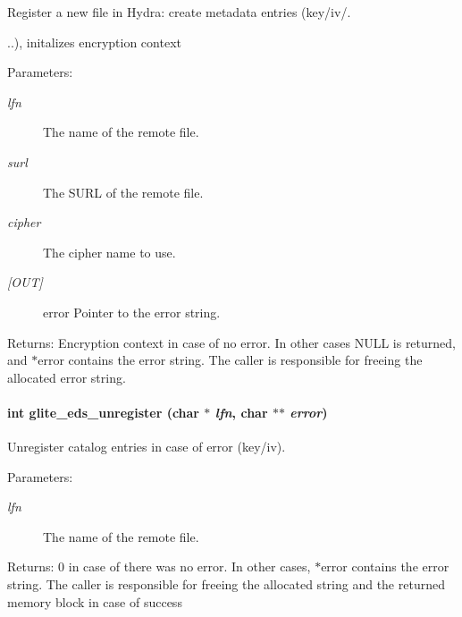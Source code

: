 Register a new file in Hydra: create metadata entries (key/iv/. 

..), initalizes encryption context

\begin{Desc}
\item[Parameters:]
\begin{description}
\item[{\em lfn}]The name of the remote file. \item[{\em surl}]The SURL of the remote file. \item[{\em cipher}]The cipher name to use. \item[{\em \mbox{[}OUT\mbox{]}}]error Pointer to the error string.\end{description}
\end{Desc}
\begin{Desc}
\item[Returns:]Encryption context in case of no error. In other cases NULL is returned, and $\ast$error contains the error string. The caller is responsible for freeing the allocated error string. \end{Desc}
\hypertarget{eds-simple_8h_a9}{
\paragraph[glite\_\-eds\_\-unregister]{\setlength{\rightskip}{0pt plus 5cm}int glite\_\-eds\_\-unregister (char $\ast$ {\em lfn}, char $\ast$$\ast$ {\em error})}\hfill}
\label{eds-simple_8h_a9}


Unregister catalog entries in case of error (key/iv). 

\begin{Desc}
\item[Parameters:]
\begin{description}
\item[{\em lfn}]The name of the remote file.\end{description}
\end{Desc}
\begin{Desc}
\item[Returns:]0 in case of there was no error. In other cases, $\ast$error contains the error string. The caller is responsible for freeing the allocated string and the returned memory block in case of success \end{Desc}
